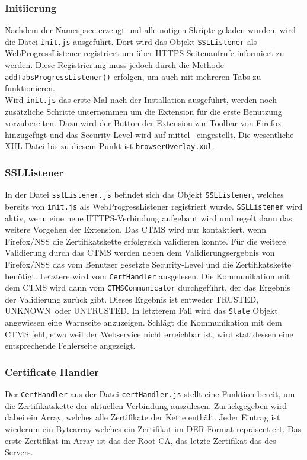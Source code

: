 \documentclass[accentcolor=tud1c,article,colorback,11pt]{tudreport}
\begin{document}
\subsubsection{Initiierung}
Nachdem der Namespace erzeugt und alle nötigen Skripte geladen wurden, wird die Datei \texttt{init.js} ausgeführt. Dort wird das Objekt \texttt{SSLListener} als WebProgressListener registriert um über HTTPS-Seitenaufrufe informiert zu werden. Diese Registrierung muss jedoch durch die Methode \texttt{addTabsProgressListener()} \cite{allTabs} erfolgen, um auch mit mehreren Tabs zu funktionieren.\\
Wird \texttt{init.js} das erste Mal nach der Installation ausgeführt, werden noch zusätzliche Schritte unternommen um die Extension für die erste Benutzung vorzubereiten. Dazu wird der Button der Extension zur Toolbar von Firefox hinzugefügt und das Security-Level wird auf \glqq mittel\grqq~ eingestellt. Die wesentliche XUL-Datei bis zu diesem Punkt ist \texttt{browserOverlay.xul}.

\subsubsection{SSLListener}
In der Datei \texttt{sslListener.js} befindet sich das Objekt \texttt{SSLListener}, welches bereits von \texttt{init.js} als WebProgressListener \cite{progressListener} registriert wurde. \texttt{SSLListener} wird aktiv, wenn eine neue HTTPS-Verbindung aufgebaut wird und regelt dann das weitere Vorgehen der Extension. Das CTMS wird nur kontaktiert, wenn Firefox/NSS die Zertifikatskette erfolgreich validieren konnte. Für die weitere Validierung durch das CTMS werden neben dem Validierungsergebnis von Firefox/NSS das vom Benutzer gesetzte Security-Level und die Zertifikatskette benötigt. Letztere wird vom \texttt{CertHandler} ausgelesen. Die Kommunikation mit dem CTMS wird dann vom \texttt{CTMSCommunicator} durchgeführt, der das Ergebnis der Validierung zurück gibt. Dieses Ergebnis ist entweder \glqq TRUSTED\grqq, \glqq UNKNOWN\grqq~oder \glqq UNTRUSTED\grqq. In letzterem Fall wird das \texttt{State} Objekt angewiesen eine Warnseite anzuzeigen. Schlägt die Kommunikation mit dem CTMS fehl, etwa weil der Webservice nicht erreichbar ist, wird stattdessen eine entsprechende Fehlerseite angezeigt.

\subsubsection{Certificate Handler}
Der \texttt{CertHandler} aus der Datei \texttt{certHandler.js} stellt eine Funktion bereit, um die Zertifikatskette der aktuellen Verbindung auszulesen. Zurückgegeben wird dabei ein Array, welches alle Zertifikate der Kette enthält. Jeder Eintrag ist wiederum ein Bytearray welches ein Zertifikat im DER-Format \cite{DER} repräsentiert. Das erste Zertifikat im Array ist das der Root-CA, das letzte Zertifikat das des Servers.
\end{document}
